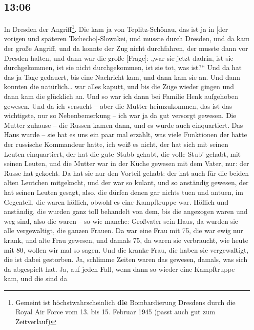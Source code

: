 \documentclass[ngerman,]{article}
\providecommand{\tightlist}{%
  \setlength{\itemsep}{0pt}\setlength{\parskip}{0pt}}
\begin{document}
\begin{multicols}{3}
\hypertarget{section-6}{%
\subsection{13:06}\label{section-6}}

\begin{description}
\tightlist
\item[Käthe]
In Dresden der Angriff\footnote{Gemeint ist höchstwahrscheinlich
  \textbf{die} Bombardierung Dresdens durch die Royal Air Force vom 13.
  bis 15. Februar 1945 (passt auch gut zum Zeitverlauf)}. Die kam ja von
Teplitz-Schönau, das ist ja in {[}der vorigen und späteren
Tschecho{]}-Slowakei, und musste durch Dresden, und da kam der große
Angriff, und da konnte der Zug nicht durchfahren, der musste dann vor
Dresden halten, und dann war die große {[}Frage{]}: „war sie jetzt
dadrin, ist sie durchgekommen, ist sie nicht durchgekommen, ist sie tot,
was ist?“ Und da hat das ja Tage gedauert, bis eine Nachricht kam, und
dann kam sie an. Und dann konnten die natürlich\ldots{} war alles
kaputt, und bis die Züge wieder gingen und dann kam die glücklich an.
Und so war ich dann bei Familie Henk aufgehoben gewesen. Und da ich
versucht – aber die Mutter heimzukommen, das ist das wichtigste, nur so
Nebenbemerkung – ich war ja da gut versorgt gewesen. Die Mutter zuhause
– die Russen kamen dann, und es wurde auch einquartiert. Das Haus wurde
– sie hat es uns ein paar mal erzählt, was viele Funktionen der hatte
der russische Kommandeur hatte, ich weiß es nicht, der hat sich mit
seinen Leuten einquartiert, der hat die gute Stubb gehabt, die volle
Stub' gehabt, mit seinen Leuten, und die Mutter war in der Küche gewesen
mit dem Vater, nur: der Russe hat gekocht. Da hat sie nur den Vorteil
gehabt: der hat auch für die beiden alten Leutchen mitgekocht, und der
war so kulant, und so anständig gewesen, der hat seinen Leuten gesagt,
also, die dürfen denen gar nichts tuen und antuen, im Gegenteil, die
waren höflich, obwohl es eine Kampftruppe war. Höflich und anständig,
die wurden ganz toll behandelt von dem, bis die angezogen waren und weg
sind, also die waren – so wie manche: Großvater sein Haus, da wurden sie
alle vergewaltigt, die ganzen Frauen. Da war eine Frau mit 75, die war
ewig nur krank, und alte Frau gewesen, und damals 75, da waren sie
verbraucht, wie heute mit 80, wollen wir mal so sagen. Und die kranke
Frau, die haben sie vergewaltigt, die ist dabei gestorben. Ja, schlimme
Zeiten waren das gewesen, damals, was sich da abgespielt hat. Ja, auf
jeden Fall, wenn dann so wieder eine Kampftruppe kam, und die sind da

\end{description}
\end{multicols}
\end{document}
